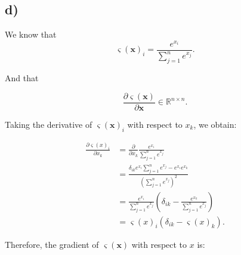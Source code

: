 \documentclass[12pt,a4paper,oneside]{paper}
\begin{document}
\newpage
\subsection*{d)}

We know that 
\[
    \bm{\varsigma}(\bm{x})_i = \frac{e^{x_i}}{\sum_{j=1}^{n} e^{x_j}}.
\]

And that

\[
\frac{\partial \bm{\varsigma}(\bm{x})}{\partial \bm{x}} \in \mathbb{R}^{n \times n}.
\]

Taking the derivative of \(\bm{\varsigma}(\bm{x})_i\) with respect to \(x_k\), we obtain:

\begin{align*}
\frac{\partial \varsigma(x)_i}{\partial x_k} &= \frac{\partial}{\partial x_k} \frac{e^{x_i}}{\sum_{j=1}^{n} e^{x_j}} \\
&= \frac{\delta_{ik}  e^{x_i} \sum_{j=1}^{n} e^{x_j} - e^{x_i} e^{x_k}}{\left(\sum_{j=1}^{n} e^{x_j}\right)^2} \\
&= \frac{e^{x_i}}{\sum_{j=1}^{n} e^{x_j}} \left(\delta_{ik}  - \frac{e^{x_k}}{\sum_{j=1}^{n} e^{x_j}}\right) \\
&= \varsigma(x)_i \left(\delta_{ik}  - \varsigma(x)_k\right).
\end{align*}

Therefore, the gradient of \(\bm{\varsigma}(\bm{x})\) with respect to \(x\) is:
\end{document}
